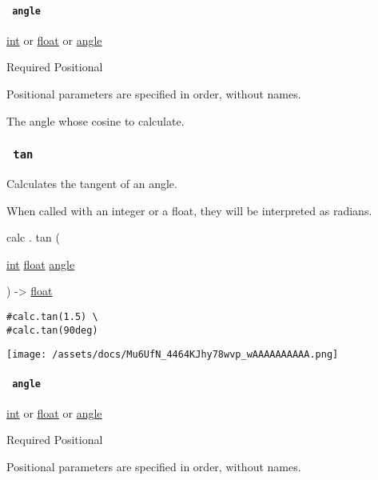 \paragraph{\texorpdfstring{\texttt{\ angle\ }}{ angle }}\label{functions-cos-angle}

\href{/docs/reference/foundations/int/}{int} {or}
\href{/docs/reference/foundations/float/}{float} {or}
\href{/docs/reference/layout/angle/}{angle}

{Required} {{ Positional }}

\label{functions-cos-angle-positional-tooltip}
Positional parameters are specified in order, without names.

The angle whose cosine to calculate.

\subsubsection{\texorpdfstring{\texttt{\ tan\ }}{ tan }}\label{functions-tan}

Calculates the tangent of an angle.

When called with an integer or a float, they will be interpreted as
radians.

calc { . } { tan } (

{ \href{/docs/reference/foundations/int/}{int}
\href{/docs/reference/foundations/float/}{float}
\href{/docs/reference/layout/angle/}{angle} }

) -\textgreater{} \href{/docs/reference/foundations/float/}{float}

\begin{verbatim}
#calc.tan(1.5) \
#calc.tan(90deg)
\end{verbatim}

\texttt{[image: /assets/docs/Mu6UfN\_4464KJhy78wvp\_wAAAAAAAAAA.png]}

\paragraph{\texorpdfstring{\texttt{\ angle\ }}{ angle }}\label{functions-tan-angle}

\href{/docs/reference/foundations/int/}{int} {or}
\href{/docs/reference/foundations/float/}{float} {or}
\href{/docs/reference/layout/angle/}{angle}

{Required} {{ Positional }}

\label{functions-tan-angle-positional-tooltip}
Positional parameters are specified in order, without names.

